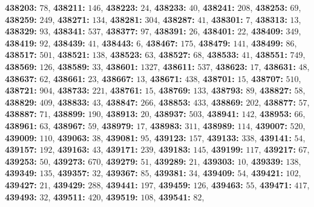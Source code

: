 \textsf{\bfseries 438203:} $78$, \textsf{\bfseries 438211:} $146$, \textsf{\bfseries 438223:} $24$, \textsf{\bfseries 438233:} $40$, \textsf{\bfseries 438241:} $208$, \textsf{\bfseries 438253:} $69$, \textsf{\bfseries 438259:} $249$, \textsf{\bfseries 438271:} $134$, \textsf{\bfseries 438281:} $304$, \textsf{\bfseries 438287:} $41$, \textsf{\bfseries 438301:} $7$, \textsf{\bfseries 438313:} $13$, \textsf{\bfseries 438329:} $93$, \textsf{\bfseries 438341:} $537$, \textsf{\bfseries 438377:} $97$, \textsf{\bfseries 438391:} $26$, \textsf{\bfseries 438401:} $22$, \textsf{\bfseries 438409:} $349$, \textsf{\bfseries 438419:} $92$, \textsf{\bfseries 438439:} $41$, \textsf{\bfseries 438443:} $6$, \textsf{\bfseries 438467:} $175$, \textsf{\bfseries 438479:} $141$, \textsf{\bfseries 438499:} $86$, \textsf{\bfseries 438517:} $501$, \textsf{\bfseries 438521:} $138$, \textsf{\bfseries 438523:} $63$, \textsf{\bfseries 438527:} $68$, \textsf{\bfseries 438533:} $41$, \textsf{\bfseries 438551:} $749$, \textsf{\bfseries 438569:} $126$, \textsf{\bfseries 438589:} $33$, \textsf{\bfseries 438601:} $1327$, \textsf{\bfseries 438611:} $537$, \textsf{\bfseries 438623:} $17$, \textsf{\bfseries 438631:} $48$, \textsf{\bfseries 438637:} $62$, \textsf{\bfseries 438661:} $23$, \textsf{\bfseries 438667:} $13$, \textsf{\bfseries 438671:} $438$, \textsf{\bfseries 438701:} $15$, \textsf{\bfseries 438707:} $510$, \textsf{\bfseries 438721:} $904$, \textsf{\bfseries 438733:} $221$, \textsf{\bfseries 438761:} $15$, \textsf{\bfseries 438769:} $133$, \textsf{\bfseries 438793:} $89$, \textsf{\bfseries 438827:} $58$, \textsf{\bfseries 438829:} $409$, \textsf{\bfseries 438833:} $43$, \textsf{\bfseries 438847:} $266$, \textsf{\bfseries 438853:} $433$, \textsf{\bfseries 438869:} $202$, \textsf{\bfseries 438877:} $57$, \textsf{\bfseries 438887:} $71$, \textsf{\bfseries 438899:} $190$, \textsf{\bfseries 438913:} $20$, \textsf{\bfseries 438937:} $503$, \textsf{\bfseries 438941:} $142$, \textsf{\bfseries 438953:} $66$, \textsf{\bfseries 438961:} $63$, \textsf{\bfseries 438967:} $59$, \textsf{\bfseries 438979:} $17$, \textsf{\bfseries 438983:} $311$, \textsf{\bfseries 438989:} $114$, \textsf{\bfseries 439007:} $520$, \textsf{\bfseries 439009:} $110$, \textsf{\bfseries 439063:} $38$, \textsf{\bfseries 439081:} $95$, \textsf{\bfseries 439123:} $157$, \textsf{\bfseries 439133:} $338$, \textsf{\bfseries 439141:} $54$, \textsf{\bfseries 439157:} $192$, \textsf{\bfseries 439163:} $43$, \textsf{\bfseries 439171:} $239$, \textsf{\bfseries 439183:} $145$, \textsf{\bfseries 439199:} $117$, \textsf{\bfseries 439217:} $67$, \textsf{\bfseries 439253:} $50$, \textsf{\bfseries 439273:} $670$, \textsf{\bfseries 439279:} $51$, \textsf{\bfseries 439289:} $21$, \textsf{\bfseries 439303:} $10$, \textsf{\bfseries 439339:} $138$, \textsf{\bfseries 439349:} $135$, \textsf{\bfseries 439357:} $32$, \textsf{\bfseries 439367:} $85$, \textsf{\bfseries 439381:} $34$, \textsf{\bfseries 439409:} $54$, \textsf{\bfseries 439421:} $102$, \textsf{\bfseries 439427:} $21$, \textsf{\bfseries 439429:} $288$, \textsf{\bfseries 439441:} $197$, \textsf{\bfseries 439459:} $126$, \textsf{\bfseries 439463:} $55$, \textsf{\bfseries 439471:} $417$, \textsf{\bfseries 439493:} $32$, \textsf{\bfseries 439511:} $420$, \textsf{\bfseries 439519:} $108$, \textsf{\bfseries 439541:} $82$, 
